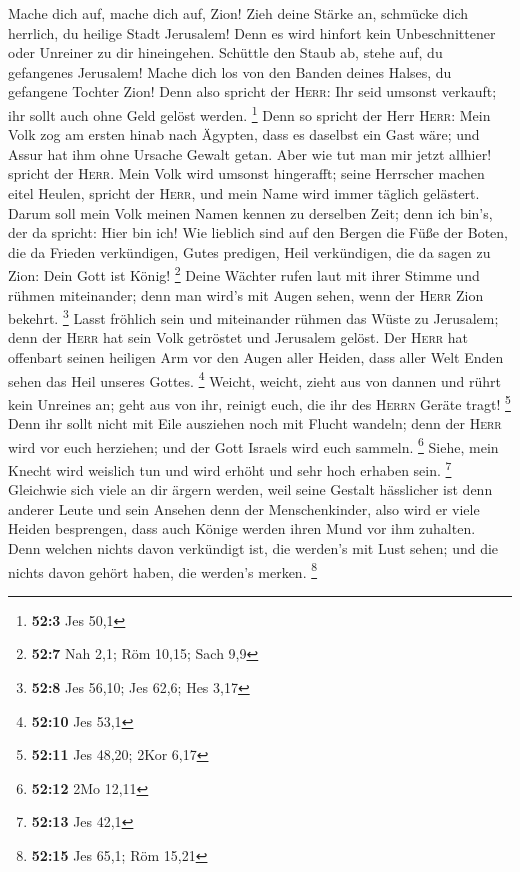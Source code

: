  Mache dich auf, mache dich auf, Zion! Zieh deine Stärke
an, schmücke dich herrlich, du heilige Stadt Jerusalem! Denn es wird
hinfort kein Unbeschnittener oder Unreiner zu dir hineingehen.
 Schüttle den Staub ab, stehe auf, du gefangenes
Jerusalem! Mache dich los von den Banden deines Halses, du gefangene
Tochter Zion!  Denn also spricht der \textsc{Herr}: Ihr
seid umsonst verkauft; ihr sollt auch ohne Geld gelöst werden.
\footnote{\textbf{52:3} Jes 50,1}  Denn so spricht der
Herr \textsc{Herr}: Mein Volk zog am ersten hinab nach Ägypten, dass es
daselbst ein Gast wäre; und Assur hat ihm ohne Ursache Gewalt getan.
 Aber wie tut man mir jetzt allhier! spricht der
\textsc{Herr}. Mein Volk wird umsonst hingerafft; seine Herrscher machen
eitel Heulen, spricht der \textsc{Herr}, und mein Name wird immer
täglich gelästert.  Darum soll mein Volk meinen Namen
kennen zu derselben Zeit; denn ich bin's, der da spricht: Hier bin ich!
 Wie lieblich sind auf den Bergen die Füße der Boten, die
da Frieden verkündigen, Gutes predigen, Heil verkündigen, die da sagen
zu Zion: Dein Gott ist König! \footnote{\textbf{52:7} Nah 2,1; Röm
  10,15; Sach 9,9}  Deine Wächter rufen laut mit ihrer
Stimme und rühmen miteinander; denn man wird's mit Augen sehen, wenn der
\textsc{Herr} Zion bekehrt. \footnote{\textbf{52:8} Jes 56,10; Jes 62,6;
  Hes 3,17}  Lasst fröhlich sein und miteinander rühmen
das Wüste zu Jerusalem; denn der \textsc{Herr} hat sein Volk getröstet
und Jerusalem gelöst.  Der \textsc{Herr} hat offenbart
seinen heiligen Arm vor den Augen aller Heiden, dass aller Welt Enden
sehen das Heil unseres Gottes. \footnote{\textbf{52:10} Jes 53,1}
 Weicht, weicht, zieht aus von dannen und rührt kein
Unreines an; geht aus von ihr, reinigt euch, die ihr des \textsc{Herrn}
Geräte tragt! \footnote{\textbf{52:11} Jes 48,20; 2Kor 6,17}
 Denn ihr sollt nicht mit Eile ausziehen noch mit Flucht
wandeln; denn der \textsc{Herr} wird vor euch herziehen; und der Gott
Israels wird euch sammeln. \footnote{\textbf{52:12} 2Mo 12,11}
 Siehe, mein Knecht wird weislich tun und wird erhöht und
sehr hoch erhaben sein. \footnote{\textbf{52:13} Jes 42,1}
 Gleichwie sich viele an dir ärgern werden, weil seine
Gestalt hässlicher ist denn anderer Leute und sein Ansehen denn der
Menschenkinder,  also wird er viele Heiden besprengen,
dass auch Könige werden ihren Mund vor ihm zuhalten. Denn welchen nichts
davon verkündigt ist, die werden's mit Lust sehen; und die nichts davon
gehört haben, die werden's merken. \footnote{\textbf{52:15} Jes 65,1;
  Röm 15,21}

